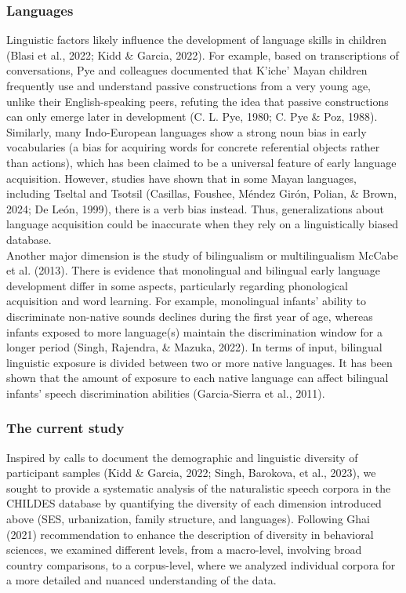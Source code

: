 \documentclass[
  man,floatsintext]{apa6}
\begin{document}
\subsubsection{Languages}\label{languages}

Linguistic factors likely influence the development of language skills in children (Blasi et al., 2022; Kidd \& Garcia, 2022). For example, based on transcriptions of conversations, Pye and colleagues documented that K'iche' Mayan children frequently use and understand passive constructions from a very young age, unlike their English-speaking peers, refuting the idea that passive constructions can only emerge later in development (C. L. Pye, 1980; C. Pye \& Poz, 1988).
Similarly, many Indo-European languages show a strong noun bias in early vocabularies (a bias for acquiring words for concrete referential objects rather than actions), which has been claimed to be a universal feature of early language acquisition. However, studies have shown that in some Mayan languages, including Tseltal and Tsotsil (Casillas, Foushee, Méndez Girón, Polian, \& Brown, 2024; De León, 1999), there is a verb bias instead. Thus, generalizations about language acquisition could be inaccurate when they rely on a linguistically biased database.\\
Another major dimension is the study of bilingualism or multilingualism McCabe et al. (2013). There is evidence that monolingual and bilingual early language development differ in some aspects, particularly regarding phonological acquisition and word learning. For example, monolingual infants' ability to discriminate non-native sounds declines during the first year of age, whereas infants exposed to more language(s) maintain the discrimination window for a longer period (Singh, Rajendra, \& Mazuka, 2022). In terms of input, bilingual linguistic exposure is divided between two or more native languages. It has been shown that the amount of exposure to each native language can affect bilingual infants' speech discrimination abilities (Garcia-Sierra et al., 2011).

\subsubsection{The current study}\label{the-current-study}

Inspired by calls to document the demographic and linguistic diversity of participant samples (Kidd \& Garcia, 2022; Singh, Barokova, et al., 2023), we sought to provide a systematic analysis of the naturalistic speech corpora in the CHILDES database by quantifying the diversity of each dimension introduced above (SES, urbanization, family structure, and languages). Following Ghai (2021) recommendation to enhance the description of diversity in behavioral sciences, we examined different levels, from a macro-level, involving broad country comparisons, to a corpus-level, where we analyzed individual corpora for a more detailed and nuanced understanding of the data.
\end{document}

